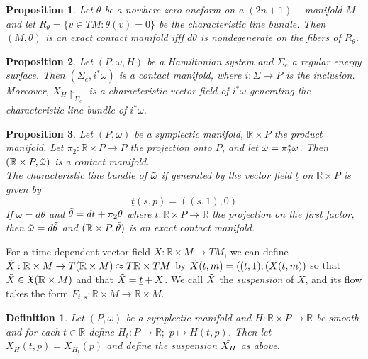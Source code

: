 \documentclass{article}
\newtheorem{defn}{Definition}
\newtheorem{prop}{Proposition}
\begin{document}
\begin{prop}
Let $\theta$ be a nowhere zero oneform on a $(2n+1)-$manifold $M$ and let $R_\theta=\{v \in TM: \theta(v)=0\}$ be the characteristic line bundle. Then $(M, \theta)$ is an exact contact manifold ifff $d\theta$ is nondegenerate on the fibers of $R_\theta$.
\end{prop}

\begin{prop}
Let $(P,\omega,H)$ be a Hamiltonian system and $\Sigma_e$ a regular energy surface. Then $(\Sigma_e, i^*\omega)$ is a contact manifold, where $i: \Sigma \to P$ is the inclusion. Moreover, $X_H \restriction_{\Sigma_e}$ is a characteristic vector field of $i^*\omega$ generating the characteristic line bundle of $i^*\omega$.
\end{prop}

\begin{prop}

Let $(P,\omega)$ be a symplectic manifold, $\mathbb{R} \times P$ the product manifold. Let $\pi_2: \mathbb{R} \times P \to P$ the projection onto $P$, and let $\Tilde{\omega} = \pi_2^*\omega$. Then $(\mathbb{R} \times P, \Tilde{\omega})$ is a contact manifold. \\
\indent The characteristic line bundle of $\Tilde{\omega}$ if generated by the vector field $\underline{t}$ on $\mathbb{R} \times P$ is given by
\[\underline{t}(s,p) = \left( (s,1),0 \right)\]
If $\omega = d \theta$ and $\Tilde{\theta}=dt+\pi_2 \theta$ where $t: \mathbb{R} \times P \to \mathbb{R}$ the projection on the first factor, then $\Tilde{\omega} = d \Tilde{\theta}$ and $(\mathbb{R} \times P, \Tilde{\theta})$ is an exact contact manifold.
\end{prop}

For a time dependent vector field $X: \mathbb{R} \times M \to TM$, we can define $\Tilde{X}: \mathbb{R} \times M \to T(\mathbb{R} \times M) \approx T\mathbb{R} \times TM$ by $\Tilde{X}(t,m) = ((t,1),(X(t,m))$ so that $\Tilde{X} \in \mathfrak{X}(\mathbb{R} \times M)$ and that $\Tilde{X}= \underline{t}+X$. We call $\Tilde{X}$ the \textit{suspension} of $X$, and its flow takes the form $F_{t,s}:\mathbb{R}\times M \to \mathbb{R} \times M$.

\begin{defn}
Let $(P,\omega)$ be a symplectic manifold and $H: \mathbb{R} \times P \to \mathbb{R}$ be smooth and for each $t \in \mathbb{R}$ define $H_t: P \to \mathbb{R}; \hspace{4pt} p \mapsto H(t,p)$. Then let $X_H(t,p) = X_{H_t}(p)$ and define the suspension $\Tilde{X_H}$ as above.
\end{defn}
\end{document}
